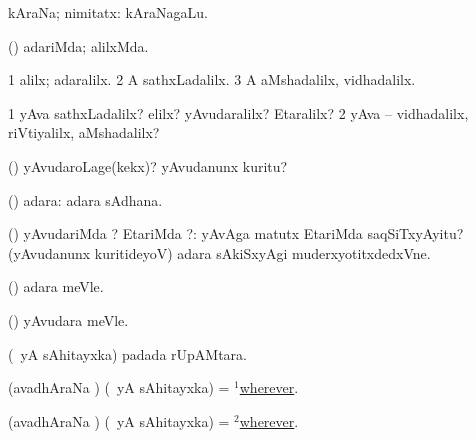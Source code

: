 \bentry
{} 
\gl{\nA}
\expl{}
\bmng
kAraNa; nimitatx:  kAraNagaLu. 
\emng
\eentry

\bentry
{} 
\gl{\saMavayx}
\expl{}
\bmng
(\pArxparx) adariMda; alilxMda. 
\emng
\eentry

\bentry
{} 
\gl{\saMavayx}
\expl{}
\bmng
\bnum
\num{1} alilx; adaralilx. 
\num{2} A sathxLadalilx. 
\num{3} A aMshadalilx, vidhadalilx. 
\enum
\emng
\eentry

\bentry
{} 
\gl{\kirxvi}
\expl{(\aupa) }
\bmng
\bnum
\num{1} yAva sathxLadalilx? elilx? yAvudaralilx? Etaralilx? 
\num{2} yAva -- vidhadalilx, riVtiyalilx, aMshadalilx? 
\enum
\emng
\eentry

\bentry
{} 
\gl{\kirxvi}
\expl{}
\bmng
(\pArxparx) yAvudaroLage(kekx)? yAvudanunx kuritu? 
\emng
\eentry

\bentry
{} 
\gl{\saMavayx}
\expl{}
\bmng
(\aupa) adara:  adara sAdhana. 
\emng
\eentry

\bentry
{} 
\gl{\kirxvi}
\expl{}
\bmng
(\aupa) yAvudariMda ? EtariMda ?:  yAvAga matutx EtariMda saqSiTxyAyitu?  (yAvudanunx kuritideyoV) adara sAkiSxyAgi muderxyotitxdedxVne. 
\emng
\eentry

\bentry
{} 
\gl{\saMavayx}
\expl{}
\bmng
(\pArxparx) adara meVle. 
\emng
\eentry

\bentry
{} 
\gl{\kirxvi}
\expl{}
\bmng
(\pArxparx) yAvudara meVle. 
\emng
\eentry

\bentry
{} 
\expl{}
\bmng
 (\aupa\ yA sAhitayxka)  padada rUpAMtara. 
\emng
\eentry

\bentry
{} 
\gl{\kirxvi}
\expl{}
\bmng
(avadhAraNa \parx) (\aupa\ yA sAhitayxka) = \hyperlink{wherever(1)}{$^1$wherever}. 
\emng
\eentry

\bentry
{} 
\gl{\saMavayx}
\expl{}
\bmng
(avadhAraNa \parx) (\aupa\ yA sAhitayxka) = \hyperlink{wherever(2)}{$^2$wherever}. 
\emng
\eentry

